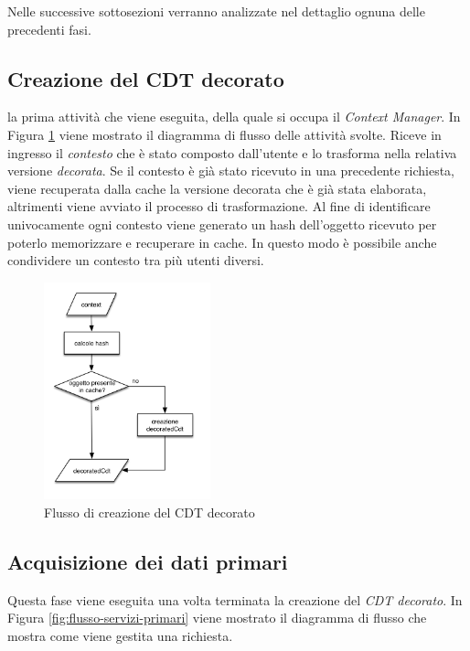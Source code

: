 Nelle successive sottosezioni verranno analizzate nel dettaglio ognuna delle precedenti fasi.

\subsection*{Creazione del CDT decorato}

\upe la prima attività che viene eseguita, della quale si occupa il \emph{Context Manager}. In Figura \ref{fig:flusso-decorated-cdt} viene mostrato il diagramma di flusso delle attività svolte. Riceve in ingresso il \emph{contesto} che è stato composto dall'utente e lo trasforma nella relativa versione \emph{decorata}. Se il contesto è già stato ricevuto in una precedente richiesta, viene recuperata dalla cache la versione decorata che è già stata elaborata, altrimenti viene avviato il processo di trasformazione. Al fine di identificare univocamente ogni contesto viene generato un hash dell'oggetto ricevuto per poterlo memorizzare e recuperare in cache. In questo modo è possibile anche condividere un contesto tra più utenti diversi.

\begin{figure}[ht]
	\centering
	\includegraphics[width=0.43\textwidth]{5-implementazione-backend/Immagini/diagramma_flusso_decoratedCdt.png}
	\caption{Flusso di creazione del CDT decorato\label{fig:flusso-decorated-cdt}}
\end{figure}

\subsection*{Acquisizione dei dati primari}

Questa fase viene eseguita una volta terminata la creazione del \emph{CDT decorato}. In Figura \ref{fig:flusso-servizi-primari} viene mostrato il diagramma di flusso che mostra come viene gestita una richiesta.

